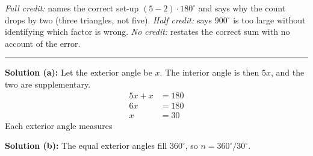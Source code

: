 \documentclass[12pt]{article}
\begin{document}
\emph{Full credit:} names the correct set-up $(5-2)\cdot 180^\circ$ and says why the count drops by two (three triangles, not five). \emph{Half credit:} says $900^\circ$ is too large without identifying which factor is wrong. \emph{No credit:} restates the correct sum with no account of the error.

\vspace{0.2cm}\noindent\rule{\linewidth}{0.2pt}


\textbf{Solution (a):} Let the exterior angle be $x$. The interior angle is then $5x$, and the two are supplementary.
\begin{align*}
  5x + x &= 180 \\
  6x &= 180 \\
  x &= 30
\end{align*}
Each exterior angle measures 

\textbf{Solution (b):} The equal exterior angles fill $360^\circ$, so $n = 360^\circ / 30^\circ$. 
\end{document}
